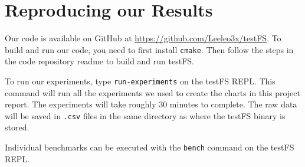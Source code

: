 \section{Reproducing our Results}
Our code is available on GitHub at \url{https://github.com/Leeleo3x/testFS}.
To build and run our code, you need to first install {\tt cmake}. Then
follow the steps in the code repository readme to build and run testFS.

To run our experiments, type {\tt run-experiments} on the testFS REPL. This
command will run all the experiments we used to create the charts in this
project report. The experiments will take roughly 30 minutes to complete. The
raw data will be saved in {\tt .csv} files in the same directory as where the
testFS binary is stored.

Individual benchmarks can be executed with the {\tt bench} command on the
testFS REPL.
